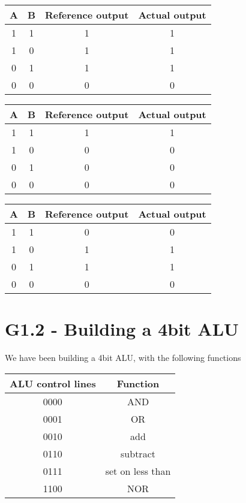\documentclass[11pt,a4paper]{article}
\begin{document}
\begin{table}[htb!]
    \centering
    \begin{tabular}{c | c || c || c}
        A & B & Reference output & Actual output \\ \hline
        1 & 1 & 1                & 1        \\
        1 & 0 & 1                & 1        \\
        0 & 1 & 1                & 1        \\
        0 & 0 & 0                & 0        \\
    \end{tabular}
\end{table}

\begin{table}[htb!]
    \centering
    \begin{tabular}{c | c || c || c}
        A & B & Reference output & Actual output \\ \hline
        1 & 1 & 1                & 1        \\
        1 & 0 & 0                & 0        \\
        0 & 1 & 0                & 0        \\
        0 & 0 & 0                & 0        \\
    \end{tabular}
\end{table}

\begin{table}[htb!]
    \centering
    \begin{tabular}{c | c || c || c}
        A & B & Reference output & Actual output \\ \hline
        1 & 1 & 0                & 0        \\
        1 & 0 & 1                & 1        \\
        0 & 1 & 1                & 1        \\
        0 & 0 & 0                & 0        \\
    \end{tabular}
\end{table}

\section*{G1.2 - Building a 4bit ALU}
We have been building a 4bit ALU, with the following functions

\begin{table}[htb!]
\begin{tabular}{| c | c |}
    \centering
    ALU control lines & Function \\ \hline 
    0000 & AND \\
    0001 & OR \\
    0010 & add \\
    0110 & subtract \\
    0111 & set on less than \\
    1100 & NOR \\

\end{tabular}
\end{table}
\end{document}
